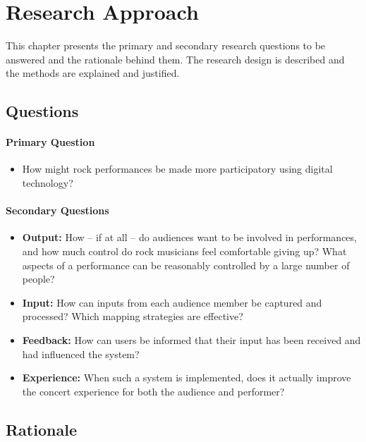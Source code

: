 \chapter{Research Approach}

This chapter presents the primary and secondary research questions to be answered and the rationale behind them. The research design is described and the methods are explained and justified.

\section{Questions}

\subsubsection{Primary Question}

\begin{itemize}
	\item How might rock performances be made more participatory using digital technology?
\end{itemize}

\subsubsection{Secondary Questions}

\begin{itemize}
	\item \textbf{Output:} How -- if at all -- do audiences want to be involved in performances, and how much control do rock musicians feel comfortable giving up? What aspects of a performance can be reasonably controlled by a large number of people?

	\item \textbf{Input:} How can inputs from each audience member be captured and processed? Which mapping strategies are effective?

	\item \textbf{Feedback:} How can users be informed that their input has been received and had influenced the system?

	\item \textbf{Experience:} When such a system is implemented, does it actually improve the concert experience for both the audience and performer?
\end{itemize}


\section{Rationale}

